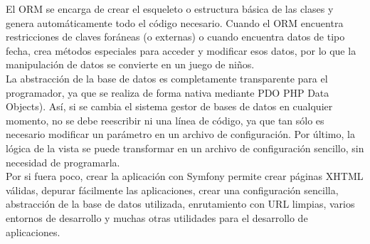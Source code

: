 El ORM se encarga de crear el esqueleto o estructura básica de las clases y genera automáticamente todo el código necesario. Cuando el ORM encuentra restricciones de claves foráneas (o externas) o cuando encuentra datos de tipo fecha, crea métodos especiales para acceder y modificar esos datos, por lo que la manipulación de datos se convierte en un juego de niños.\\

La abstracción de la base de datos es completamente transparente para el programador, ya que se realiza de forma nativa mediante PDO PHP Data Objects). Así, si se cambia el sistema gestor de bases de datos en cualquier momento, no se debe reescribir ni una línea de código, ya que tan sólo es necesario modificar un parámetro en un archivo de configuración.
Por último, la lógica de la vista se puede transformar en un archivo de configuración sencillo, sin necesidad de programarla.\\
Por si fuera poco, crear la aplicación con Symfony permite crear páginas XHTML válidas, depurar fácilmente las aplicaciones, crear una configuración sencilla, abstracción de la base de datos utilizada, enrutamiento con URL limpias, varios entornos de desarrollo y muchas otras utilidades para el desarrollo de aplicaciones.